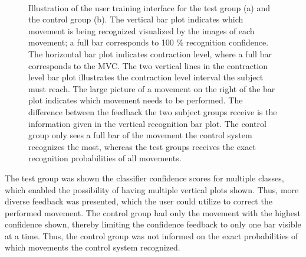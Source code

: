 \begin{figure}[H] 
	\centering
	 \\
	\caption{Illustration of the user training interface for the test group (a) and the control group (b). The vertical bar plot indicates which movement is being recognized visualized by the images of each movement; a full bar corresponds to 100 \% recognition confidence. The horizontal bar plot indicates contraction level, where a full bar corresponds to the MVC. The two vertical lines in the contraction level bar plot illustrates the contraction level interval the subject must reach. The large picture of a movement on the right of the bar plot indicates which movement needs to be performed. The difference between the feedback the two subject groups receive is the information given in the vertical recognition bar plot. The control group only sees a full bar of the movement the control system recognizes the most, whereas the test groups receives the exact recognition probabilities of all movements.}
	\label{fig:feedbackGUI}
\end{figure}

The test group was shown the classifier confidence scores for multiple classes, which enabled the possibility of having multiple vertical plots shown. Thus, more diverse feedback was presented, which the user could utilize to correct the performed movement. The control group had only the movement with the highest confidence shown, thereby limiting the confidence feedback to only one bar visible at a time. Thus, the control group was not informed on the exact probabilities of which movements the control system recognized.      


